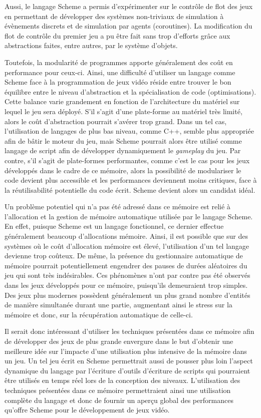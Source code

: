 \documentclass[12pt,twoside,letterpaper,francais]{book}
\begin{document}
Aussi, le langage Scheme a permis d'expérimenter sur le contrôle de
flot des jeux en permettant de développer des systèmes non-triviaux de
simulation à évènements discrets et de simulation par agents
(coroutines). La modification du flot de contrôle du premier jeu a pu
être fait sans trop d'efforts grâce aux abstractions faites, entre
autres, par le système d'objets.

Toutefois, la modularité de programmes apporte généralement des coût
en performance pour ceux-ci. Ainsi, une difficulté d'utiliser un
langage comme Scheme face à la programmation de jeux vidéo réside
entre trouver le bon équilibre entre le niveau d'abstraction et la
spécialisation de code (optimisations). Cette balance varie grandement
en fonction de l'architecture du matériel sur lequel le jeu sera
déployé. S'il s'agit d'une plate-forme au matériel très limité, alors
le coût d'abstraction pourrait s'avérer trop grand. Dans un tel cas,
l'utilisation de langages de plus bas niveau, comme C++, semble plus
appropriée afin de bâtir le moteur du jeu, mais Scheme pourrait
alors être utilisé comme langage de script afin de développer
dynamiquement le \textit{gameplay} du jeu. Par contre, s'il s'agit de
plate-formes performantes, comme c'est le cas pour les jeux développés
dans le cadre de ce mémoire, alors la possibilité de modulariser le
code devient plus accessible et les performances deviennent moins
critiques, face à la réutilisabilité potentielle du code
écrit. Scheme devient alors un candidat idéal.

Un problème potentiel qui n'a pas été adressé dans ce mémoire est
relié à l'allocation et la gestion de mémoire automatique utilisée par
le langage Scheme. En effet, puisque Scheme est un langage
fonctionnel, ce dernier effectue généralement beaucoup d'allocations
mémoire. Ainsi, il est possible que sur des systèmes où le coût
d'allocation mémoire est élevé, l'utilisation d'un tel langage
devienne trop coûteux. De même, la présence du gestionnaire
automatique de mémoire pourrait potentiellement engendrer des pauses
de durées aléatoires du jeu qui sont très indésirables. Ces phénomènes
n'ont par contre pas été observés dans les jeux développés pour ce
mémoire, puisqu'ils demeuraient trop simples. Des jeux plus modernes
possèdent généralement un plus grand nombre d'entités de manière
simultanée durant une partie, augmentant ainsi le stress sur la
mémoire et donc, sur la récupération automatique de celle-ci.

Il serait donc intéressant d'utiliser les techniques présentées dans
ce mémoire afin de développer des jeux de plus grande envergure dans
le but d'obtenir une meilleure idée sur l'impacte d'une utilisation
plus intensive de la mémoire dans un jeu. Un tel jeu écrit en Scheme
permettrait aussi de pousser plus loin l'aspect dynamique du langage
par l'écriture d'outils d'écriture de scripts qui pourraient être
utilisés en temps réel lors de la conception des
niveaux. L'utilisation des techniques présentées dans ce mémoire
permettraient ainsi une utilisation complète du langage et donc de
fournir un aperçu global des performances qu'offre Scheme pour le
dévelop\-pement de jeux vidéo.



\singlespacing


\appendix
\end{document}
